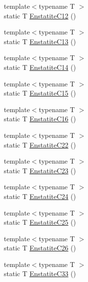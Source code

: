 \begin{DoxyCompactItemize}
\item 
{\footnotesize template$<$typename T $>$ }\\static T \mbox{\hyperlink{namespacempc_1_1data_aa2bbd4adf8938196d9e13efd07c02311}{Enstatite\+C12}} ()
\item 
{\footnotesize template$<$typename T $>$ }\\static T \mbox{\hyperlink{namespacempc_1_1data_ae78c4d555604d2fdb2502bb2855142ef}{Enstatite\+C13}} ()
\item 
{\footnotesize template$<$typename T $>$ }\\static T \mbox{\hyperlink{namespacempc_1_1data_af5c0211ec6b7111009cb7773bdee3c04}{Enstatite\+C14}} ()
\item 
{\footnotesize template$<$typename T $>$ }\\static T \mbox{\hyperlink{namespacempc_1_1data_a8dbeced0b3d3b080f6eca77b69f10253}{Enstatite\+C15}} ()
\item 
{\footnotesize template$<$typename T $>$ }\\static T \mbox{\hyperlink{namespacempc_1_1data_aebee6503a9d061763c76fe2244e3715c}{Enstatite\+C16}} ()
\item 
{\footnotesize template$<$typename T $>$ }\\static T \mbox{\hyperlink{namespacempc_1_1data_a8b340836157780822d34439e711a2656}{Enstatite\+C22}} ()
\item 
{\footnotesize template$<$typename T $>$ }\\static T \mbox{\hyperlink{namespacempc_1_1data_af79140114d2f2b096bbac29b877163d5}{Enstatite\+C23}} ()
\item 
{\footnotesize template$<$typename T $>$ }\\static T \mbox{\hyperlink{namespacempc_1_1data_a03ec54e4369e490988c920f534dd2db2}{Enstatite\+C24}} ()
\item 
{\footnotesize template$<$typename T $>$ }\\static T \mbox{\hyperlink{namespacempc_1_1data_a9167f3400021ae09ff00867dc979107f}{Enstatite\+C25}} ()
\item 
{\footnotesize template$<$typename T $>$ }\\static T \mbox{\hyperlink{namespacempc_1_1data_af56427575ea2ac9d5c1377d2593b4608}{Enstatite\+C26}} ()
\item 
{\footnotesize template$<$typename T $>$ }\\static T \mbox{\hyperlink{namespacempc_1_1data_af73260a39912a7def11bb8f3861e4428}{Enstatite\+C33}} ()
\item 

\end{DoxyCompactItemize}

